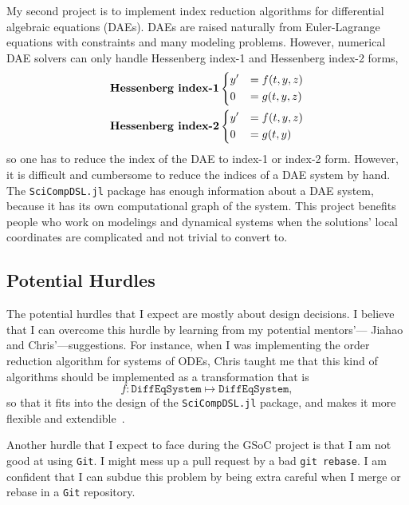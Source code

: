 \documentclass[12pt]{article}
\begin{document}
My second project is to implement index reduction algorithms for differential
algebraic equations (DAEs). DAEs are raised naturally from Euler-Lagrange
equations with constraints and many modeling problems. However, numerical DAE
solvers can only handle Hessenberg index-1 and Hessenberg index-2 forms,
\begin{align}
  &\textbf{Hessenberg index-1}
  \begin{dcases}
    y' &= f(t,y,z)\\
    0 &= g(t,y,z)
  \end{dcases}\\
  &\textbf{Hessenberg index-2}
  \begin{dcases}
    y' &= f(t,y,z)\\
    0 &= g(t,y)
  \end{dcases}
\end{align}
so one has to reduce the index of the DAE to index-1 or index-2 form. However,
it is difficult and cumbersome to reduce the indices of a DAE system by hand.
The \texttt{SciCompDSL.jl} package has enough information about a DAE system,
because it has its own computational graph of the system. This project benefits
people who work on modelings and dynamical systems when the solutions' local
coordinates are complicated and not trivial to convert to.

\subsection{Potential Hurdles}
The potential hurdles that I expect are mostly about design decisions. I
believe that I can overcome this hurdle by learning from my potential
mentors'--- Jiahao and Chris'---suggestions. For instance, when I was
implementing the order reduction algorithm for systems of ODEs, Chris taught me
that this kind of algorithms should be implemented as a transformation that is
\[
  f: \texttt{DiffEqSystem}\mapsto \texttt{DiffEqSystem},
\]
so that it fits into the design of the \texttt{SciCompDSL.jl} package, and
makes it more flexible and extendible~\cite{i49}.

Another hurdle that I expect to face during the GSoC project is that I am not
good at using \texttt{Git}. I might mess up a pull request by a bad \texttt{git
rebase}. I am confident that I can subdue this problem by being extra careful
when I merge or rebase in a \texttt{Git} repository.
\end{document}
